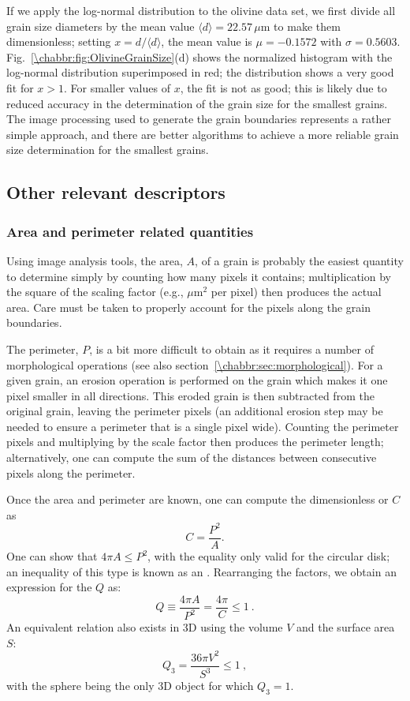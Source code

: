 If we apply the log-normal distribution to the olivine data set, we first divide all grain size diameters by the mean value $\langle d\rangle=22.57\,\mu$m to make them dimensionless; setting $x=d/\langle d\rangle$, the mean value is $\mu=-0.1572$ with $\sigma=0.5603$.  Fig.~\ref{\chabbr:fig:OlivineGrainSize}(d) shows the normalized histogram with the log-normal distribution superimposed in red; the distribution shows a very good fit for $x>1$.  For smaller values of $x$, the fit is not as good; this is likely due to reduced accuracy in the determination of the grain size for the smallest grains.  The image processing used to generate the grain boundaries represents a rather simple approach, and there are better algorithms to achieve a more reliable grain size determination for the smallest grains.  

\subsection{Other relevant descriptors}

\subsubsection{Area and perimeter related quantities}
Using image analysis tools, the area, $A$, of a grain is probably the easiest quantity to determine simply by counting how many pixels it contains; multiplication by the square of the scaling factor (e.g., $\mu$m$^2$ per pixel) then produces the actual area.  Care must be taken to properly account for the pixels along the grain boundaries.  

The perimeter, $P$, is a bit more difficult to obtain as it requires a number of morphological operations (see also section~\ref{\chabbr:sec:morphological}). For a given grain, an erosion operation is performed on the grain which makes it one pixel smaller in all directions. This eroded grain is then subtracted from the original grain, leaving the perimeter pixels (an additional erosion step may be needed to ensure a perimeter that is a single pixel wide).  Counting the perimeter pixels and multiplying by the scale factor then produces the perimeter length; alternatively, one can compute the sum of the distances between consecutive pixels along the perimeter.

Once the area and perimeter are known, one can compute the dimensionless   or  $C$ as
\[
	C = \frac{P^2}{A} .
\]
One can show that $4\pi A \le P^2$, with the equality only valid for the circular disk; an inequality of this type is known as an .  Rearranging the factors, we obtain an expression for the  $Q$ as:
\begin{equation}
	Q \equiv \frac{4\pi A}{P^2} = \frac{4\pi}{C} \le 1\ .\label{\chabbr:eq:IQ}
\end{equation}
An equivalent relation also exists in 3D using the volume $V$ and the surface area $S$:
\begin{equation}
	Q_3 = \frac{36\pi V^2}{S^3} \le 1\ ,\label{\chabbr:eq:IQ3} 
\end{equation}
with the sphere being the only 3D object for which $Q_3=1$. 

